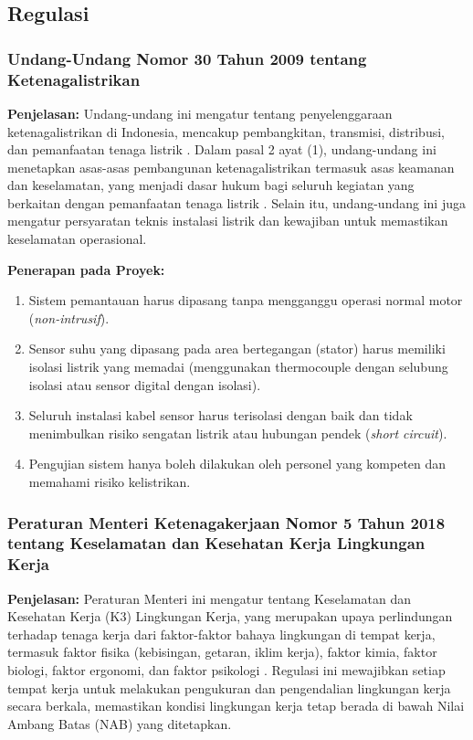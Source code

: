 \documentclass{elsinta}
\begin{document}
\subsection{Regulasi}


\subsubsection{Undang-Undang Nomor 30 Tahun 2009 tentang Ketenagalistrikan}

\textbf{Penjelasan:} Undang-undang ini mengatur tentang penyelenggaraan ketenagalistrikan di Indonesia, mencakup pembangkitan, transmisi, distribusi, dan pemanfaatan tenaga listrik \cite{uu30_2009}. Dalam pasal 2 ayat (1), undang-undang ini menetapkan asas-asas pembangunan ketenagalistrikan termasuk asas keamanan dan keselamatan, yang menjadi dasar hukum bagi seluruh kegiatan yang berkaitan dengan pemanfaatan tenaga listrik \cite{uu30_2009}. Selain itu, undang-undang ini juga mengatur persyaratan teknis instalasi listrik dan kewajiban untuk memastikan keselamatan operasional.

\textbf{Penerapan pada Proyek:}
\begin{enumerate}
    \item Sistem pemantauan harus dipasang tanpa mengganggu operasi normal motor (\textit{non-intrusif}).
    \item Sensor suhu yang dipasang pada area bertegangan (stator) harus memiliki isolasi listrik yang memadai (menggunakan thermocouple dengan selubung isolasi atau sensor digital dengan isolasi).
    \item Seluruh instalasi kabel sensor harus terisolasi dengan baik dan tidak menimbulkan risiko sengatan listrik atau hubungan pendek (\textit{short circuit}).
    \item Pengujian sistem hanya boleh dilakukan oleh personel yang kompeten dan memahami risiko kelistrikan.
\end{enumerate}

\subsubsection{Peraturan Menteri Ketenagakerjaan Nomor 5 Tahun 2018 tentang Keselamatan dan Kesehatan Kerja Lingkungan Kerja}

\textbf{Penjelasan:} Peraturan Menteri ini mengatur tentang Keselamatan dan Kesehatan Kerja (K3) Lingkungan Kerja, yang merupakan upaya perlindungan terhadap tenaga kerja dari faktor-faktor bahaya lingkungan di tempat kerja, termasuk faktor fisika (kebisingan, getaran, iklim kerja), faktor kimia, faktor biologi, faktor ergonomi, dan faktor psikologi \cite{permenaker5_2018}. Regulasi ini mewajibkan setiap tempat kerja untuk melakukan pengukuran dan pengendalian lingkungan kerja secara berkala, memastikan kondisi lingkungan kerja tetap berada di bawah Nilai Ambang Batas (NAB) yang ditetapkan.
\end{document}
